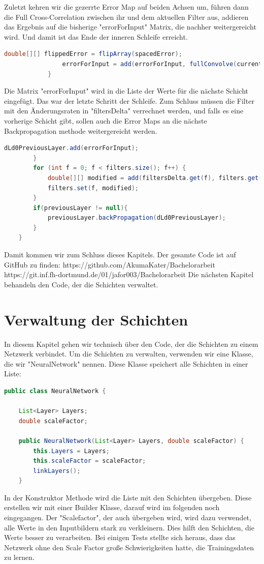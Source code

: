 \documentclass[12pt]{article}
\begin{document}
Zuletzt kehren wir die gezerrte Error Map auf beiden Achsen um, führen dann die Full Cross-Correlation zwischen ihr und dem aktuellen Filter aus, addieren das Ergebnis auf die bisherige "errorForInput" Matrix, die nachher weitergereicht wird. Und damit ist das Ende der inneren Schleife erreicht.
\begin{lstlisting}[language=Java]
                double[][] flippedError = flipArray(spacedError);
                errorForInput = add(errorForInput, fullConvolve(currentFilter, flippedError));
            }
\end{lstlisting}
Die Matrix "errorForInput" wird in die Liste der Werte für die nächste Schicht eingefügt. Das war der letzte Schritt der Schleife. Zum Schluss müssen die Filter mit den Änderungsraten in "filtersDelta" verrechnet werden, und falls es eine vorherige Schicht gibt, sollen auch die Error Maps an die nächste Backpropagation methode weitergereicht werden.
\begin{lstlisting}[language=Java]
            dLd0PreviousLayer.add(errorForInput);
        }
        for (int f = 0; f < filters.size(); f++) {
            double[][] modified = add(filtersDelta.get(f), filters.get(f));
            filters.set(f, modified);
        }
        if(previousLayer != null){
            previousLayer.backPropagation(dLd0PreviousLayer);
        }
    }
\end{lstlisting}

Damit kommen wir zum Schluss dieses Kapitels. Der gesamte Code ist auf GitHub zu finden:
https://github.com/AkumaKater/Bachelorarbeit
https://git.inf.fh-dortmund.de/01/jafor003/Bachelorarbeit
Die nächsten Kapitel behandeln den Code, der die Schichten verwaltet. 

\cleardoublepage
\section{Verwaltung der Schichten}
In diesem Kapitel gehen wir technisch über den Code, der die Schichten zu einem Netzwerk verbindet.
Um die Schichten zu verwalten, verwenden wir eine Klasse, die wir "NeuralNetwork" nennen. Diese Klasse speichert alle Schichten in einer Liste:

\begin{lstlisting}[language=Java]
public class NeuralNetwork {

    List<Layer> Layers;
    double scaleFactor;

    public NeuralNetwork(List<Layer> Layers, double scaleFactor) {
        this.Layers = Layers;
        this.scaleFactor = scaleFactor;
        linkLayers();
    }
\end{lstlisting}
In der Konstruktor Methode wird die Liste mit den Schichten übergeben. Diese erstellen wir mit einer Builder Klasse, darauf wird im folgenden noch eingegangen. Der "Scalefactor", der auch übergeben wird, wird dazu verwendet, alle Werte in den Inputbildern stark zu verkleinern. Dies hilft den Schichten, die Werte besser zu verarbeiten.
Bei einigen Tests stellte sich heraus, dass das Netzwerk ohne den Scale Factor große Schwierigkeiten hatte, die Trainingsdaten zu lernen.
\end{document}
